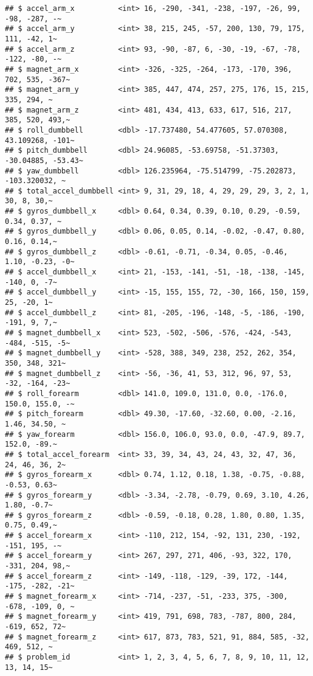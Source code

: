 \documentclass[]{article}
\begin{document}
\begin{verbatim}
## $ accel_arm_x          <int> 16, -290, -341, -238, -197, -26, 99, -98, -287, -~
## $ accel_arm_y          <int> 38, 215, 245, -57, 200, 130, 79, 175, 111, -42, 1~
## $ accel_arm_z          <int> 93, -90, -87, 6, -30, -19, -67, -78, -122, -80, -~
## $ magnet_arm_x         <int> -326, -325, -264, -173, -170, 396, 702, 535, -367~
## $ magnet_arm_y         <int> 385, 447, 474, 257, 275, 176, 15, 215, 335, 294, ~
## $ magnet_arm_z         <int> 481, 434, 413, 633, 617, 516, 217, 385, 520, 493,~
## $ roll_dumbbell        <dbl> -17.737480, 54.477605, 57.070308, 43.109268, -101~
## $ pitch_dumbbell       <dbl> 24.96085, -53.69758, -51.37303, -30.04885, -53.43~
## $ yaw_dumbbell         <dbl> 126.235964, -75.514799, -75.202873, -103.320032, ~
## $ total_accel_dumbbell <int> 9, 31, 29, 18, 4, 29, 29, 29, 3, 2, 1, 30, 8, 30,~
## $ gyros_dumbbell_x     <dbl> 0.64, 0.34, 0.39, 0.10, 0.29, -0.59, 0.34, 0.37, ~
## $ gyros_dumbbell_y     <dbl> 0.06, 0.05, 0.14, -0.02, -0.47, 0.80, 0.16, 0.14,~
## $ gyros_dumbbell_z     <dbl> -0.61, -0.71, -0.34, 0.05, -0.46, 1.10, -0.23, -0~
## $ accel_dumbbell_x     <int> 21, -153, -141, -51, -18, -138, -145, -140, 0, -7~
## $ accel_dumbbell_y     <int> -15, 155, 155, 72, -30, 166, 150, 159, 25, -20, 1~
## $ accel_dumbbell_z     <int> 81, -205, -196, -148, -5, -186, -190, -191, 9, 7,~
## $ magnet_dumbbell_x    <int> 523, -502, -506, -576, -424, -543, -484, -515, -5~
## $ magnet_dumbbell_y    <int> -528, 388, 349, 238, 252, 262, 354, 350, 348, 321~
## $ magnet_dumbbell_z    <int> -56, -36, 41, 53, 312, 96, 97, 53, -32, -164, -23~
## $ roll_forearm         <dbl> 141.0, 109.0, 131.0, 0.0, -176.0, 150.0, 155.0, -~
## $ pitch_forearm        <dbl> 49.30, -17.60, -32.60, 0.00, -2.16, 1.46, 34.50, ~
## $ yaw_forearm          <dbl> 156.0, 106.0, 93.0, 0.0, -47.9, 89.7, 152.0, -89.~
## $ total_accel_forearm  <int> 33, 39, 34, 43, 24, 43, 32, 47, 36, 24, 46, 36, 2~
## $ gyros_forearm_x      <dbl> 0.74, 1.12, 0.18, 1.38, -0.75, -0.88, -0.53, 0.63~
## $ gyros_forearm_y      <dbl> -3.34, -2.78, -0.79, 0.69, 3.10, 4.26, 1.80, -0.7~
## $ gyros_forearm_z      <dbl> -0.59, -0.18, 0.28, 1.80, 0.80, 1.35, 0.75, 0.49,~
## $ accel_forearm_x      <int> -110, 212, 154, -92, 131, 230, -192, -151, 195, -~
## $ accel_forearm_y      <int> 267, 297, 271, 406, -93, 322, 170, -331, 204, 98,~
## $ accel_forearm_z      <int> -149, -118, -129, -39, 172, -144, -175, -282, -21~
## $ magnet_forearm_x     <int> -714, -237, -51, -233, 375, -300, -678, -109, 0, ~
## $ magnet_forearm_y     <int> 419, 791, 698, 783, -787, 800, 284, -619, 652, 72~
## $ magnet_forearm_z     <int> 617, 873, 783, 521, 91, 884, 585, -32, 469, 512, ~
## $ problem_id           <int> 1, 2, 3, 4, 5, 6, 7, 8, 9, 10, 11, 12, 13, 14, 15~
\end{verbatim}
\end{document}
